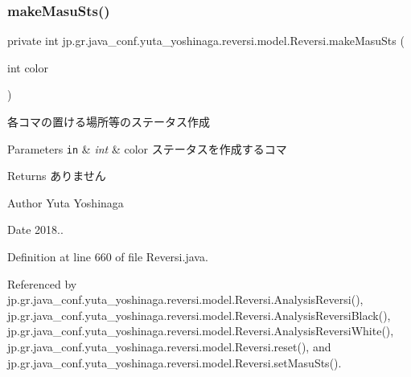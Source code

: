 \subsubsection{\texorpdfstring{make\+Masu\+Sts()}{makeMasuSts()}}
{\footnotesize\ttfamily private int jp.\+gr.\+java\+\_\+conf.\+yuta\+\_\+yoshinaga.\+reversi.\+model.\+Reversi.\+make\+Masu\+Sts (\begin{DoxyParamCaption}\item[{int}]{color }\end{DoxyParamCaption})\hspace{0.3cm}{\ttfamily [private]}}



各コマの置ける場所等のステータス作成 


\begin{DoxyParams}[1]{Parameters}
\mbox{\tt in}  & {\em int} & color ステータスを作成するコマ \\
\hline
\end{DoxyParams}
\begin{DoxyReturn}{Returns}
ありません 
\end{DoxyReturn}
\begin{DoxyAuthor}{Author}
Yuta Yoshinaga 
\end{DoxyAuthor}
\begin{DoxyDate}{Date}
2018.. 
\end{DoxyDate}


Definition at line 660 of file Reversi.\+java.



Referenced by jp.\+gr.\+java\+\_\+conf.\+yuta\+\_\+yoshinaga.\+reversi.\+model.\+Reversi.\+Analysis\+Reversi(), jp.\+gr.\+java\+\_\+conf.\+yuta\+\_\+yoshinaga.\+reversi.\+model.\+Reversi.\+Analysis\+Reversi\+Black(), jp.\+gr.\+java\+\_\+conf.\+yuta\+\_\+yoshinaga.\+reversi.\+model.\+Reversi.\+Analysis\+Reversi\+White(), jp.\+gr.\+java\+\_\+conf.\+yuta\+\_\+yoshinaga.\+reversi.\+model.\+Reversi.\+reset(), and jp.\+gr.\+java\+\_\+conf.\+yuta\+\_\+yoshinaga.\+reversi.\+model.\+Reversi.\+set\+Masu\+Sts().

